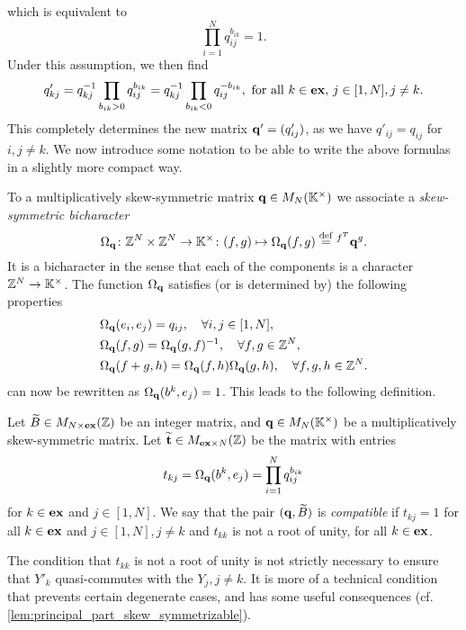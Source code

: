 which is equivalent to
\begin{equation}\label{eq:compatibility_q_b}
	\prod_{i=1}^N q_{ij}^{b_{ik}} = 1.
\end{equation}
%
Under this assumption, we then find
\begin{equation}\label{eq:mutated_q_kj}
	q'_{kj} = q_{kj}^{-1} \prod_{b_{ik} > 0}q_{ij}^{b_{ik}} = q_{kj}^{-1} \prod_{b_{ik} < 0}q_{ij}^{-b_{ik}}, \text{ for all } k \in \mathbf{ex},\, j\in [1, N], j\neq k.
\end{equation}
%
This completely determines the new matrix $\mathbf{q}' = (q'_{ij})$, as we have $q'_{ij} =
	q_{ij}$ for $i,j \neq k$. We now introduce some notation to be able to write the above
formulas in a slightly more compact way.

To a multiplicatively skew-symmetric matrix $\mathbf{q} \in M_N(\mathbb{K}^\times)$ we associate a
\emph{skew-symmetric bicharacter}
\begin{equation*}
	\Omega_{\mathbf{q}} \colon \mathbb{Z}^N \times \mathbb{Z}^N \to \mathbb{K}^\times \colon
	(f,g) \mapsto \Omega_{\mathbf{q}}(f, g) \overset{\mathrm{def}}{=} \prescript{f^T}{}{}\mathbf{q}^g.
\end{equation*}
%
%
It is a bicharacter in the sense that each of the components is a character $\mathbb{Z}^N \to
	\mathbb{K}^\times$. The function $\Omega_{\mathbf{q}}$ satisfies (or is determined by) the following
properties
\begin{align}
	 & \Omega_{\mathbf{q}} (e_i, e_j) = q_{ij}, \quad \forall i, j \in [1, N],\label{eq:Omega_of_basis}                             \\
	 & \Omega_{\mathbf{q}} (f, g) = \Omega_{\mathbf{q}} (g, f)^{-1},\quad \forall f, g \in \mathbb{Z}^N,\label{eq:Omega_skew_symmetric}            \\
	 & \Omega_{\mathbf{q}} (f + g, h) = \Omega_{\mathbf{q}}(f, h)\Omega_{\mathbf{q}}(g, h), \quad \forall f, g, h\in \mathbb{Z}^N.\label{eq:Omega_of_sum}
\end{align}
%
 can now be rewritten as $\Omega_{\mathbf{q}}(b^k, e_j) = 1$. This leads to the following definition.
\begin{definition}\label{def:compatible_pair}

	Let $\widetilde{B} \in M_{N \times \mathbf{ex}}(\mathbb{Z})$ be an integer matrix, and $\mathbf{q} \in
		M_N(\mathbb{K}^\times)$ be a multiplicatively skew-symmetric matrix. Let $\widetilde{\mathbf{t}}\in M_{\mathbf{ex}
				\times N}(\mathbb{Z})$ be the matrix with entries
	\begin{equation*}
		t_{kj} = \Omega_{\mathbf{q}}(b^k, e_j) = \prod_{i=1}^N q_{ij}^{b_{ik}}
	\end{equation*}
	for $k \in \mathbf{ex}$ and $j \in [1, N]$. We say that the pair $(\mathbf{q}, \widetilde{B})$ is \emph{compatible} if $t_{kj} = 1$ for all $k \in \mathbf{ex}$ and $j \in [1, N], j\neq k$ and  $t_{kk}$ is not a root of unity, for all $k\in \mathbf{ex}$.
\end{definition}
\begin{remark}
	The condition that $t_{kk}$ is not a root of unity is not strictly necessary to ensure that $Y'_k$ quasi-commutes with the $Y_j, j\neq k$. It is more of a technical condition that prevents certain degenerate cases, and has some useful consequences (cf. \cref{lem:principal_part_skew_symmetrizable}).
\end{remark}
%

